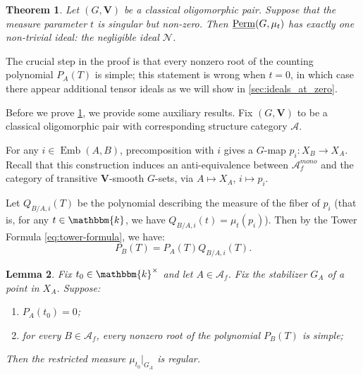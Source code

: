 \documentclass[11pt,a4paper]{amsart}
\theoremstyle{plain}%
\newtheorem{lemma}{Lemma}[subsection]
\newtheorem{theorem}[lemma]{Theorem}
\theoremstyle{definition}
\theoremstyle{remark}
\newcommand{\V}{\mathbf{V}}
\newcommand{\Perm}{\underline{{\rm Perm}}}
\newcommand{\kk}{\mathbbm{k}}
\newcommand{\Emb}{\operatorname{Emb}}
\begin{document}
\begin{theorem} \label{thm:classify-classical-nonzero} Let $(G, \V)$ be a classical oligomorphic pair. Suppose that the measure parameter $t$ is singular but non-zero. Then $\Perm(G, \mu_t)$ has exactly one non-trivial ideal: the negligible ideal $\mathcal{N}$.
\end{theorem}

The crucial step in the proof is that every nonzero root of the counting polynomial $P_A(T)$ is simple; this statement is wrong when $t=0$, in which case there appear additional tensor ideals as we will show in \cref{sec:ideals_at_zero}.

Before we prove \cref{thm:classify-classical-nonzero}, we provide some auxiliary results. Fix $(G, \V)$ to be a classical oligomorphic pair with corresponding structure category $\mathcal{A}$.


For any $i\in \Emb(A,B)$, precomposition with $i$ gives a $G$-map $ p_i:X_B\longrightarrow X_A$. Recall that this construction induces an anti-equivalence between $\mathcal{A}^{mono}_f $ and the category of transitive $\V$-smooth $G$-sets, via $A\mapsto X_A$, $i\mapsto p_i$. 

Let $Q_{B/A,i}(T)$ be the polynomial describing the measure of the fiber of $p_i$ (that is, for any $t\in \kk$, we have $Q_{B/A,i}(t)=\mu_t(p_i)$). Then by the Tower Formula \cref{eq:tower-formula}, we have:
\begin{equation}\label{eq:polynomial-ratio}
 P_B(T)=P_A(T)Q_{B/A,i}(T).
\end{equation}

\begin{lemma}\label{lem:simple-root-regularity}
Fix $t_0\in\kk^\times$ and let $A\in \mathcal{A}_f$. Fix the stabilizer $G_A$ of a point in $X_A$. Suppose:
\begin{enumerate}[label=\textup{(\roman*)}]
\item $P_A(t_0)=0$;
\item for every $B\in \mathcal{A}_f$, every nonzero root of the polynomial $P_B(T)$ is simple;

\end{enumerate}
Then the restricted measure $\mu_{t_0}\rvert_{G_A}$ is regular.
\end{lemma}
\end{document}
